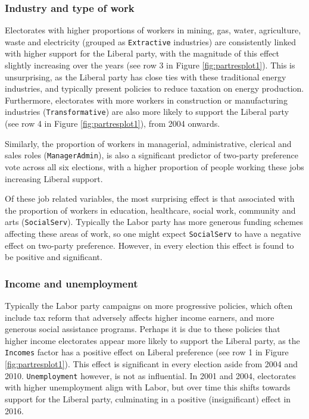 \documentclass[times, doublespace]{anzsauth}
\begin{document}
\hypertarget{industry-and-type-of-work}{%
\subsubsection*{Industry and type of work}\label{industry-and-type-of-work}}

Electorates with higher proportions of workers in mining, gas, water, agriculture, waste and electricity (grouped as \texttt{Extractive} industries) are consistently linked with higher support for the Liberal party, with the magnitude of this effect slightly increasing over the years (see row 3 in Figure \ref{fig:partresplot1}). This is unsurprising, as the Liberal party has close ties with these traditional energy industries, and typically present policies to reduce taxation on energy production. Furthermore, electorates with more workers in construction or manufacturing industries (\texttt{Transformative}) are also more likely to support the Liberal party (see row 4 in Figure \ref{fig:partresplot1}), from 2004 onwards.

Similarly, the proportion of workers in managerial, administrative, clerical and sales roles (\texttt{ManagerAdmin}), is also a significant predictor of two-party preference vote across all six elections, with a higher proportion of people working these jobs increasing Liberal support.

Of these job related variables, the most surprising effect is that associated with the proportion of workers in education, healthcare, social work, community and arts (\texttt{SocialServ}). Typically the Labor party has more generous funding schemes affecting these areas of work, so one might expect \texttt{SocialServ} to have a negative effect on two-party preference. However, in every election this effect is found to be positive and significant.

\hypertarget{income-and-unemployment}{%
\subsubsection*{Income and unemployment}\label{income-and-unemployment}}

Typically the Labor party campaigns on more progressive policies, which often include tax reform that adversely affects higher income earners, and more generous social assistance programs. Perhaps it is due to these policies that higher income electorates appear more likely to support the Liberal party, as the \texttt{Incomes} factor has a positive effect on Liberal preference (see row 1 in Figure \ref{fig:partresplot1}). This effect is significant in every election aside from 2004 and 2010. \texttt{Unemployment} however, is not as influential. In 2001 and 2004, electorates with higher unemployment align with Labor, but over time this shifts towards support for the Liberal party, culminating in a positive (insignificant) effect in 2016.
\end{document}
